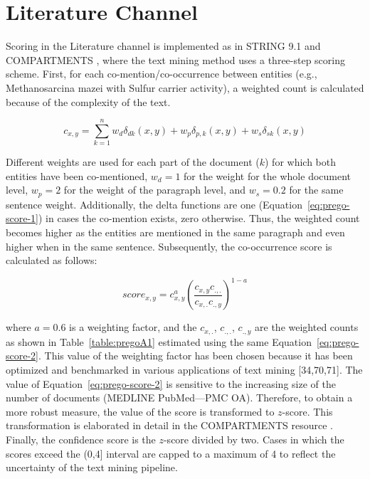 \section*{Literature Channel}

Scoring in the Literature channel is implemented as in STRING 9.1 \citep{franceschini2012string} and COMPARTMENTS \citep{binder2014compartments}, where the text mining method uses a three-step scoring scheme. 
First, for each co-mention/co-occurrence between entities (e.g., Methanosarcina mazei with Sulfur carrier activity), a weighted count is calculated because of the complexity of the text.  


\begin{equation}
   c_{x,y} = \sum_{k=1}^{n}{w_d \delta_{dk}(x,y) +w_p \delta_{p,k}(x,y) + w_s \delta_{sk}(x,y)}
   \label{eq:prego-score-1}
\end{equation}



Different weights are used for each part of the document ($k$) for which both entities have been co-mentioned, $w_d = 1$ for the weight for the whole document level, $w_p = 2$ for the weight of the paragraph level, and $w_s = 0.2$ for the same sentence weight. 
Additionally, the delta functions are one (Equation~\ref{eq:prego-score-1}) in cases the co-mention exists, zero otherwise. Thus, the weighted count becomes higher as the entities are mentioned in the same paragraph and even higher when in the same sentence.
Subsequently, the co-occurrence score is calculated as follows:

\begin{equation}
   score_{x,y} = c_{x,y}^a (\frac{c_{x,y} c_{.,.}}{c_{x, .}c_{.,y}})^{1-a}
   \label{eq:prego-score-2}
\end{equation}
   


where $a = 0.6$ is a weighting factor, and the $c_{x,.}$, $c_{.,.}$, 
$c_{.,y}$ are the weighted counts as shown in Table~\ref{table:pregoA1} estimated using the same Equation~\ref{eq:prego-score-2}. 
This value of the weighting factor has been chosen because it has been optimized and benchmarked in various applications of text mining [34,70,71]. 
The value of Equation~\ref{eq:prego-score-2} is sensitive to the increasing size of the number of documents (MEDLINE PubMed—PMC OA).
Therefore, to obtain a more robust measure, the value of the score is transformed to $z$-score. 
This transformation is elaborated in detail in the COMPARTMENTS resource \citep{binder2014compartments}. 
Finally, the confidence score is the $z$-score divided by two. Cases in which the scores exceed the (0,4] interval are capped to a maximum of 4 to reflect the uncertainty of the text mining pipeline.

